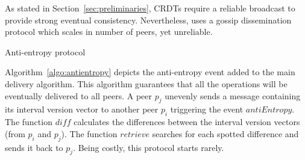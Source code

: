 As stated in Section~\ref{sec:preliminaries}, CRDTs require a reliable
broadcast to provide strong eventual consistency. Nevertheless, \EDITORNAME{}
uses a gossip dissemination protocol which scales in number of peers, yet
unreliable.

\begin{algorithm}[h]
  
  \caption{\label{algo:antientropy}Anti-entropy protocol}
\end{algorithm}

Algorithm~\ref{algo:antientropy} depicts the anti-entropy event added to the
main delivery algorithm. This algorithm guarantees that all the operations will
be eventually delivered to all peers.  A peer $p_j$ unevenly sends a message
containing its interval version vector to another peer $p_i$ triggering the
event $antiEntropy$. The function $diff$ calculates the differences between the
interval version vectors (from $p_i$ and $p_j$). The function $retrieve$
searches for each spotted difference and sends it back to $p_j$. Being costly,
this protocol starts rarely.
